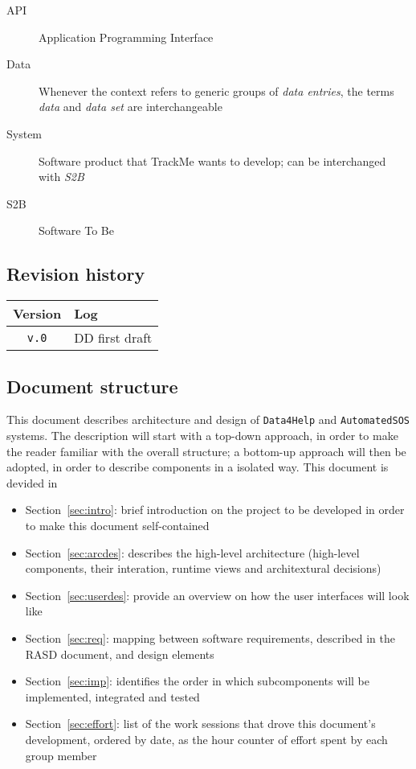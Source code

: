 \documentclass[../DD0.tex]{subfiles}
\newcommand{\addRevision}[2]{\texttt{v.#1} & #2 \\ \hline}
\begin{document}
    \begin{description}
      \item[API] Application Programming Interface
      \item[Data] Whenever the context refers to generic groups of \textit{data entries}, the terms \textit{data} and \textit{data set} are interchangeable
      \item[System] Software product that TrackMe wants to develop; can be interchanged with \textit{S2B}
      \item[S2B] Software To Be
    \end{description}

  \subsection{Revision history}
  \label{sec:revhistory}

    \begin{table}[!h]
      \begin{tabular}{|c|l|}
        \hline
        \textbf{Version}  & \textbf{Log} \\ \hline
        \addRevision{0}{DD first draft}
      \end{tabular}
    \end{table}

  \subsection{Document structure}
  \label{sec:docstructure}

  This document describes architecture and design of \texttt{Data4Help} and \texttt{AutomatedSOS} systems. The description will start with a top-down approach, in order to make the reader familiar with the overall structure; a bottom-up approach will then be adopted, in order to describe components in a isolated way. This document is devided in
  \begin{itemize}
    \item Section~\ref{sec:intro}: brief introduction on the project to be developed in order to make this document self-contained
    \item Section~\ref{sec:arcdes}: describes the high-level architecture (high-level components, their interation, runtime views and architextural decisions)
    \item Section~\ref{sec:userdes}: provide an overview on how the user interfaces will look like
    \item Section~\ref{sec:req}: mapping between software requirements, described in the RASD document, and design elements
    \item Section~\ref{sec:imp}: identifies the order in which subcomponents will be implemented, integrated and tested
    \item Section~\ref{sec:effort}: list of the work sessions that drove this document's development, ordered by date, as the hour counter of effort spent by each group member
  \end{itemize}
\end{document}
